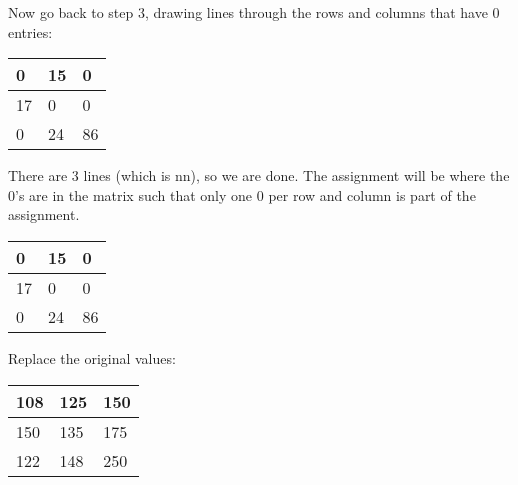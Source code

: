 Now go back to step 3, drawing lines through the rows and columns that have 0 entries:

\begin{table}[H]
\centering
\begin{tabular}{|m{0.5cm}|m{0.5cm}|m{0.5cm}|}
  \hline
  \cellcolor{gray!25} 0 & \cellcolor{gray!25} 15 & \cellcolor{gray!25} 0 \\
  \hline
  \cellcolor{gray!25} 17 & \cellcolor{gray!25} 0 & \cellcolor{gray!25} 0 \\
  \hline
  \cellcolor{gray!25} 0 & 24 & 86 \\
  \hline
\end{tabular}
\end{table}

There are 3 lines (which is nn), so we are done. The assignment will be where the 0's are in the matrix such that only one 0 per row and column is part of the assignment.

\begin{table}[H]
\centering
\begin{tabular}{|m{0.5cm}|m{0.5cm}|m{0.5cm}|}
  \hline
  0 & 15 & \cellcolor{yellow!25} 0 \\
  \hline
  17 & \cellcolor{yellow!25} 0 & 0 \\
  \hline
  \cellcolor{yellow!25} 0 & 24 & 86 \\
  \hline
\end{tabular}
\end{table}

Replace the original values:

\begin{table}[H]
\centering
\begin{tabular}{|m{0.5cm}|m{0.5cm}|m{0.5cm}|}
  \hline
  108 & 125 & \cellcolor{yellow!25} 150 \\
  \hline
  150 & \cellcolor{yellow!25} 135 & 175 \\
  \hline
  \cellcolor{yellow!25} 122 & 148 & 250 \\
  \hline
\end{tabular}
\end{table}
